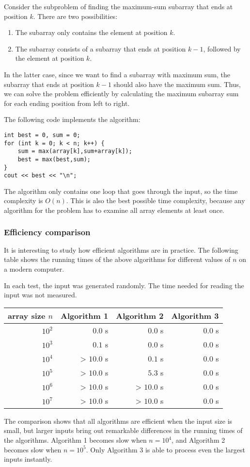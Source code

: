 Consider the subproblem of finding the maximum-sum subarray
that ends at position $k$.
There are two possibilities:
\begin{enumerate}
\item The subarray only contains the element at position $k$.
\item The subarray consists of a subarray that ends
at position $k-1$, followed by the element at position $k$.
\end{enumerate}

In the latter case, since we want to
find a subarray with maximum sum,
the subarray that ends at position $k-1$
should also have the maximum sum.
Thus, we can solve the problem efficiently
by calculating the maximum subarray sum
for each ending position from left to right.

The following code implements the algorithm:
\begin{lstlisting}
int best = 0, sum = 0;
for (int k = 0; k < n; k++) {
    sum = max(array[k],sum+array[k]);
    best = max(best,sum);
}
cout << best << "\n";
\end{lstlisting}

The algorithm only contains one loop
that goes through the input,
so the time complexity is $O(n)$.
This is also the best possible time complexity,
because any algorithm for the problem
has to examine all array elements at least once.

\subsubsection{Efficiency comparison}

It is interesting to study how efficient 
algorithms are in practice.
The following table shows the running times
of the above algorithms for different
values of $n$ on a modern computer.

In each test, the input was generated randomly.
The time needed for reading the input was not
measured.

\begin{center}
\begin{tabular}{rrrr}
array size $n$ & Algorithm 1 & Algorithm 2 & Algorithm 3 \\
\hline
$10^2$ & $0.0$ s & $0.0$ s & $0.0$ s \\
$10^3$ & $0.1$ s & $0.0$ s & $0.0$ s \\
$10^4$ & > $10.0$ s & $0.1$ s & $0.0$ s \\
$10^5$ & > $10.0$ s & $5.3$ s & $0.0$ s \\
$10^6$ & > $10.0$ s & > $10.0$ s & $0.0$ s \\
$10^7$ & > $10.0$ s & > $10.0$ s & $0.0$ s \\
\end{tabular}
\end{center}

The comparison shows that all algorithms
are efficient when the input size is small,
but larger inputs bring out remarkable
differences in the running times of the algorithms.
Algorithm 1 becomes slow
when $n=10^4$, and Algorithm 2
becomes slow when $n=10^5$.
Only Algorithm 3 is able to process
even the largest inputs instantly.
